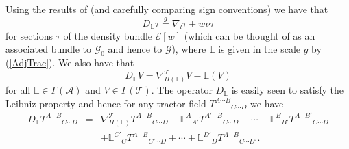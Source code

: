 \documentclass[a4paper,12pt]{amsart}
\def\Cal{\mathcal}
\newcommand{\ce}{{\Cal E}}
\theoremstyle{remark}
\newcommand{\nn}[1]{(\ref{#1})}
\begin{document}
Using the results of \cite{CapGoTAMS} (and carefully comparing sign conventions) we have that
\begin{equation}\label{LieDensity}
D_\mathbb{L} \tau \overset{g}{=} \nabla_{l}\tau + w\nu \tau
\end{equation}
for sections $\tau$ of the density bundle $\ce[w]$ (which can be thought of as an associated bundle to $\mathcal{G}_0$ and hence to $\mathcal{G}$), where $\mathbb{L}$ is given in the scale $g$ by \nn{AdjTrac}. We also have that
$$
D_\mathbb{L} V = \nabla^\mathcal{T}_{\Pi(\mathbb{L})} V - \mathbb{L}(V)
$$
for all $\mathbb{L}\in\Gamma(\mathcal{A})$ and $V\in \Gamma(\mathcal{T})$. The operator $D_\mathbb{L}$ is easily seen to satisfy the Leibniz property and hence for any tractor field $T^{A\cdots B}{_{C\cdots D}}$ we have
\begin{align*}
D_\mathbb{L} T^{A\cdots B}{_{C\cdots D}} &=& \nabla^\mathcal{T}_{\Pi(\mathbb{L})} T^{A\cdots B}{_{C\cdots D}} - \mathbb{L}^A{_{A'}} T^{A'\cdots B}{_{C\cdots D}} - \cdots - \mathbb{L}^B{_{B'}} T^{A\cdots B'}{_{C\cdots D}}\\
& & + \mathbb{L}^{C'}{_C} T^{A\cdots B}{_{C'\cdots D}} + \cdots +\mathbb{L}^{D'}{_D} T^{A\cdots B}{_{C\cdots D'}}.
\end{align*}
\end{document}
